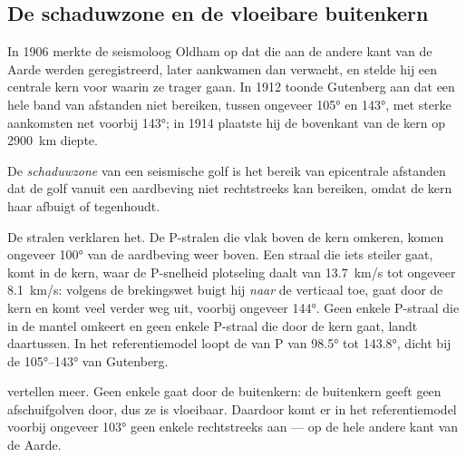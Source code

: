\subsection{De schaduwzone en de vloeibare buitenkern}

In 1906 merkte de seismoloog Oldham op dat  die aan de andere kant van de
Aarde werden geregistreerd, later aankwamen dan verwacht, en stelde hij een
centrale kern voor waarin ze trager gaan. In 1912 toonde Gutenberg aan dat
 een hele band van afstanden niet bereiken, tussen ongeveer \ang{105} en
\ang{143}, met sterke aankomsten net voorbij \ang{143}; in 1914 plaatste hij de
bovenkant van de kern op \qty{2900}{km} diepte.

\begin{definition}[Schaduwzone]\label{def:g11:seismic-structure:shadow-zone}
De \emph{schaduwzone} van een seismische golf is het bereik van
epicentrale afstanden dat de golf vanuit een aardbeving niet rechtstreeks kan
bereiken, omdat de kern haar afbuigt of tegenhoudt.
\end{definition}

De stralen verklaren het. De P-stralen die vlak boven de kern omkeren, komen
ongeveer \ang{100} van de aardbeving weer boven. Een straal die iets steiler gaat,
komt in de kern, waar de P-snelheid plotseling daalt van \qty{13.7}{km/s} tot
ongeveer \qty{8.1}{km/s}: volgens de brekingswet buigt hij \emph{naar} de verticaal
toe, gaat door de kern en komt veel verder weg uit, voorbij ongeveer \ang{144}.
Geen enkele P-straal die in de mantel omkeert en geen enkele P-straal die door de
kern gaat, landt daartussen. In het referentiemodel loopt de  van P van
\ang{98.5} tot \ang{143.8}, dicht bij de \ang{105}--\ang{143} van Gutenberg.

 vertellen meer. Geen enkele  gaat door de buitenkern: de buitenkern
geeft geen afschuifgolven door, dus ze is vloeibaar. Daardoor komt er in het
referentiemodel voorbij ongeveer \ang{103} geen enkele  rechtstreeks aan ---
op de hele andere kant van de Aarde.

